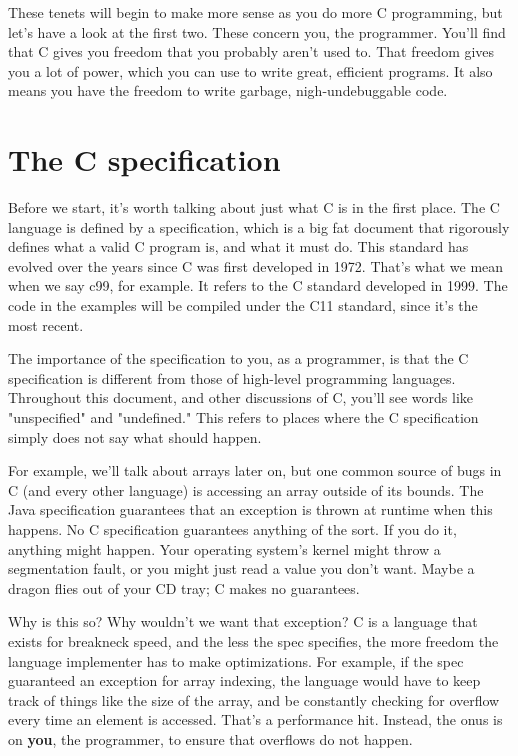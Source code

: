 \documentclass[ebook,11pt,oneside,openany]{memoir}
\begin{document}
These tenets will begin to make more sense as you do more C programming, but let's have a look at the first two. These concern you, the programmer. You'll find that C gives you freedom that you probably aren't used to. That freedom gives you a lot of power, which you can use to write great, efficient programs. It also means you have the freedom to write garbage, nigh-undebuggable code.

\section{The C specification}

Before we start, it's worth talking about just what C is in the first place. The C language is defined by a specification, which is a big fat document that rigorously defines what a valid C program is, and what it must do. This standard has evolved over the years since C was first developed in 1972. That's what we mean when we say c99, for example. It refers to the C standard developed in 1999. The code in the examples will be compiled under the C11 standard, since it's the most recent.

The importance of the specification to you, as a programmer, is that the C specification is different from those of high-level programming languages. Throughout this document, and other discussions of C, you'll see words like "unspecified" and "undefined." This refers to places where the C specification simply does not say what should happen. 

For example, we'll talk about arrays later on, but one common source of bugs in C (and every other language) is accessing an array outside of its bounds. The Java specification guarantees that an exception is thrown at runtime when this happens. No C specification guarantees anything of the sort. If you do it, anything might happen. Your operating system's kernel might throw a segmentation fault, or you might just read a value you don't want. Maybe a dragon flies out of your CD tray; C makes no guarantees.

Why is this so? Why wouldn't we want that exception? C is a language that exists for breakneck speed, and the less the spec specifies, the more freedom the language implementer has to make optimizations. For example, if the spec guaranteed an exception for array indexing, the language would have to keep track of things like the size of the array, and be constantly checking for overflow every time an element is accessed. That's a performance hit. Instead, the onus is on \textbf{you}, the programmer, to ensure that overflows do not happen.
\end{document}
